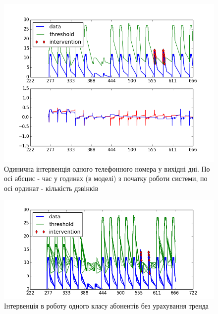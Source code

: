 \begin{figure}[h!]
        \begin{center}
            \includegraphics[scale=0.6]{resources/model_1_3_one.png}
        \end{center}
        \caption{Одинична інтервенція одного телефонного номера у вихідні дні. По осі абсцис - час у годинах (в моделі) з початку роботи системи, по осі ординат - кількість дзвінків}
        \label{fig:model_poc_one}
\end{figure}

\begin{figure}[h!]
        \begin{center}
            \includegraphics[scale=0.6]{resources/model_1_4_group_notrend.png}
        \end{center}
        \caption{Інтервенція в роботу одного класу абонентів без урахування тренда}
        \label{fig:model_poc_group_notrend}
\end{figure}

